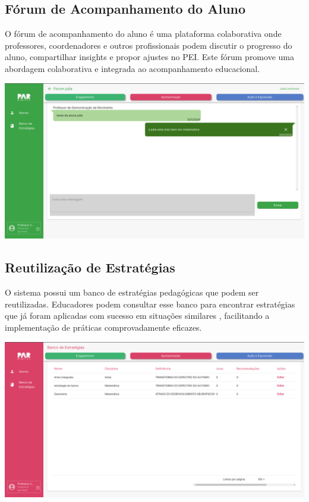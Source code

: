 \documentclass[sigconf]{webmedia}
\begin{document}
\subsection{Fórum de Acompanhamento do Aluno}
O fórum de acompanhamento do aluno é uma plataforma colaborativa onde 
professores, coordenadores e outros profissionais podem discutir o 
progresso do aluno, compartilhar insights e propor ajustes no PEI. 
Este fórum promove uma abordagem colaborativa e integrada ao 
acompanhamento educacional.
\vspace{0.5cm}

\includegraphics[scale=0.12]{./imgs/forum}

\subsection{Reutilização de Estratégias}
O sistema possui um banco de estratégias pedagógicas que podem ser 
reutilizadas. Educadores podem consultar esse banco para encontrar 
estratégias que já foram aplicadas com sucesso em situações similares
, facilitando a implementação de práticas comprovadamente eficazes.
\vspace{0.5cm}

\includegraphics[scale=0.12]{./imgs/banco}
\end{document}
